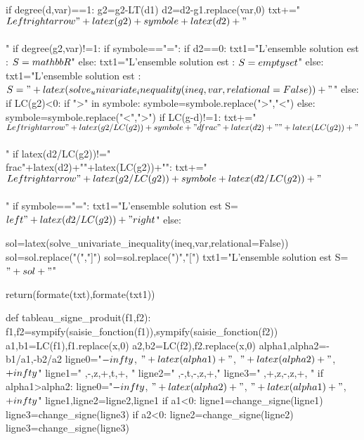 \begin{pycode}
            if degree(d,var)==1:
                g2=g2-LT(d1)
            d2=d2-g1.replace(var,0)
            txt+="$ \\Leftrightarrow "+latex(g2)+symbole+latex(d2)+"$\\\\"
        if degree(g2,var)!=1:
            if symbole=="=":
                if d2==0:
                    txt1="L'ensemble solution est : $S=\\mathbb{R}$"
                else:
                    txt1="L'ensemble solution est : $S=\\emptyset$"
            else:
                txt1="L'ensemble solution est : $S="+latex(solve_univariate_inequality(ineq,var,relational=False))+"$"
        else:
            if LC(g2)<0:
                if ">" in symbole:
                    symbole=symbole.replace(">","<")
                else:
                    symbole=symbole.replace("<",">")
            if LC(g-d)!=1:
                txt+="$ \\Leftrightarrow "+latex(g2/LC(g2))+symbole+"\\dfrac{"+latex(d2)+"}{"+latex(LC(g2))+"}$\\\\"
                if latex(d2/LC(g2))!="\\frac{"+latex(d2)+"}{"+latex(LC(g2))+"}":
                    txt+="$ \\Leftrightarrow "+latex(g2/LC(g2))+symbole+latex(d2/LC(g2))+"$\\\\"
            if symbole=="=":
                txt1="L'ensemble solution est S=$\\left\\{"+latex(d2/LC(g2))+"\\right\\}$"
            else:

                sol=latex(solve_univariate_inequality(ineq,var,relational=False))
                sol=sol.replace("(","]")
                sol=sol.replace(")","[")
                txt1="L'ensemble solution est S=$"+sol+"$"


    return(formate(txt),formate(txt1))


def tableau_signe_produit(f1,f2):
    f1,f2=sympify(saisie_fonction(f1)),sympify(saisie_fonction(f2))
    a1,b1=LC(f1),f1.replace(x,0)
    a2,b2=LC(f2),f2.replace(x,0)
    alpha1,alpha2=-b1/a1,-b2/a2
    ligne0="$-\\infty$, $"+latex(alpha1)+"$, $"+latex(alpha2)+"$, $+\\infty$"
    ligne1=" ,-,z,+,t,+, "
    ligne2=" ,-,t,-,z,+,"
    ligne3=" ,+,z,-,z,+, "
    if alpha1>alpha2:
        ligne0="$-\\infty$, $"+latex(alpha2)+"$, $"+latex(alpha1)+"$, $+\\infty$"
        ligne1,ligne2=ligne2,ligne1
    if a1<0:
        ligne1=change_signe(ligne1)
        ligne3=change_signe(ligne3)
    if a2<0:
        ligne2=change_signe(ligne2)
        ligne3=change_signe(ligne3)


\end{pycode}
